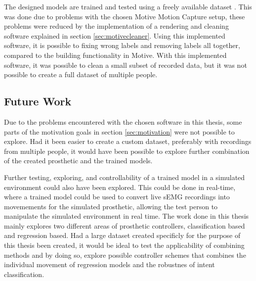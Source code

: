 \documentclass[../main.tex]{subfiles}
\begin{document}
The designed models are trained and tested using a freely available dataset \cite{kinmus}.
This was done due to problems with the chosen Motive Motion Capture setup, these problems were reduced by the implementation of a rendering and cleaning software explained in section \ref{sec:motivecleaner}.
Using this implemented software, it is possible to fixing wrong labels and removing labels all together, compared to the building functionality in Motive.
With this implemented software, it was possible to clean a small subset of recorded data, but it was not possible to create a full dataset of multiple people.

\newpage
\subsection{Future Work}

Due to the problems encountered with the chosen software in this thesis, some parts of the motivation goals in section \ref{sec:motivation} were not possible to explore.
Had it been easier to create a custom dataset, preferably with recordings from multiple people, it would have been possible to explore further combination of the created prosthetic and the trained models.

Further testing, exploring, and controllability of a trained model in a simulated environment could also have been explored.
This could be done in real-time, where a trained model could be used to convert live sEMG recordings into movemements for the simulated prosthetic, allowing the test person to manipulate the simulated environment in real time.
The work done in this thesis mainly explores two different areas of prosthetic controllers, classification based and regression based.
Had a large dataset created specificly for the purpose of this thesis been created, it would be ideal to test the applicability of combining methods and by doing so, explore possible controller schemes that combines the individual movement of regression models and the robustnes of intent classification.  
\end{document}
